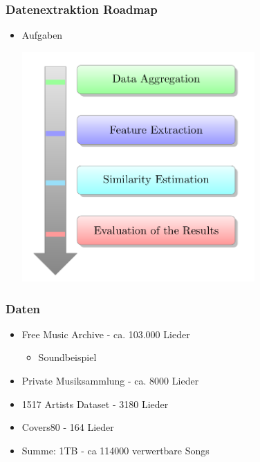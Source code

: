 \documentclass[12pt]{FSUBeamer_official}
\begin{document}
\begin{frame}
	\frametitle{Datenextraktion Roadmap}
	\begin{itemize}
		\item Aufgaben\\
		\begin{minipage}[b]{0.85\linewidth}
			\centering
			\includegraphics[width=0.7\textwidth]{pics/Org/Tasks.png}	
		\end{minipage}
	\end{itemize}
\end{frame}

\begin{frame}
	\frametitle{Daten}
	\begin{itemize}
		\item Free Music Archive - ca. 103.000 Lieder 
		\begin{itemize}
			\item Soundbeispiel
		\end{itemize}
		\item Private Musiksammlung - ca. 8000 Lieder
		\item 1517 Artists Dataset - 3180 Lieder
		\item Covers80 - 164 Lieder
		\item Summe: 1TB - ca 114000 verwertbare Songs 
	\end{itemize}
\end{frame}
\end{document}
